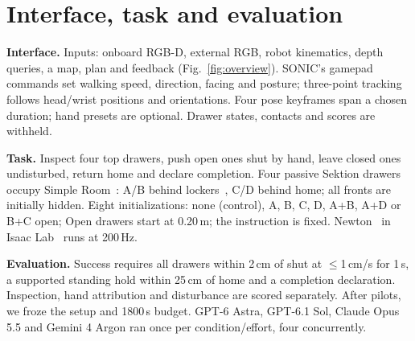 \documentclass{article}
\begin{document}
\section{Interface, task and evaluation}
\textbf{Interface.} Inputs: onboard RGB-D, external RGB, robot kinematics,
depth queries, a map, plan and feedback (Fig.~\ref{fig:overview}). SONIC's
gamepad commands set walking speed, direction, facing and posture; three-point
tracking follows head/wrist positions and orientations. Four pose keyframes
span a chosen duration; hand presets are optional. Drawer states,
contacts and scores are withheld.

\textbf{Task.} Inspect four top drawers, push open ones shut by hand, leave
closed ones undisturbed, return home and declare completion. Four passive Sektion
drawers~\citep{isaaclab2026cabinet} occupy Simple
Room~\citep{nvidia2026warehouseassets,nvidia2026assetlicense}: A/B behind
lockers~\citep{nvidia2026simready}, C/D behind home; all fronts are initially hidden.
Eight initializations: none (control), A, B, C, D, A+B, A+D or B+C open;
Open drawers start at 0.20\,m; the instruction is fixed. Newton~\citep{newton2025}
in Isaac Lab~\citep{isaaclab2025} runs at 200\,Hz.

\textbf{Evaluation.} Success requires all drawers within 2\,cm of shut at
$\leq$1\,cm/s for 1\,s, a supported standing hold within 25\,cm of home and a
completion declaration. Inspection, hand attribution and disturbance are scored
separately. After pilots, we froze the setup and 1800\,s budget. GPT-6 Astra,
GPT-6.1 Sol, Claude Opus 5.5 and Gemini 4 Argon ran once per condition/effort,
four concurrently.
\end{document}
